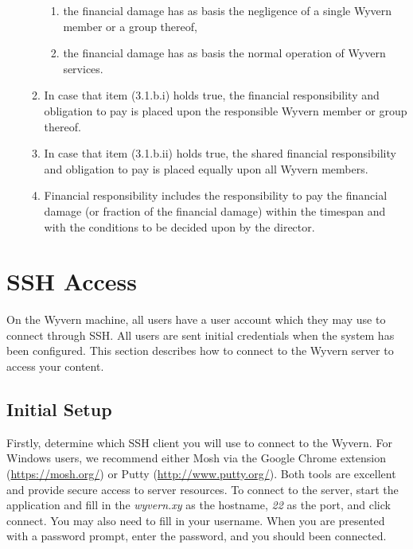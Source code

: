 \documentclass[a4paper]{article}
\begin{document}
\begin{appendices}
\begin{enumerate}
\begin{item}
\begin{enumerate}
\begin{item}
                \begin{enumerate}
                    \item the financial damage has as basis the negligence of a single Wyvern member or a group thereof,
                    \item the financial damage has as basis the normal operation of Wyvern services.
                \end{enumerate}
            \end{item}
        
            \item In case that item (3.1.b.i) holds true, the financial responsibility and obligation to pay is placed upon the responsible Wyvern member or group thereof.
            
            \item In case that item (3.1.b.ii) holds true, the shared financial responsibility and obligation to pay is placed equally upon all Wyvern members.
            
            \item Financial responsibility includes the responsibility to pay the financial damage (or fraction of the financial damage) within the timespan and with the conditions to be decided upon by the director.
        \end{enumerate}

    \end{item}
\end{enumerate}


\newpage
\section{SSH Access}
\label{sec:ssh}

On the Wyvern machine, all users have a user account which they may use to connect through SSH. All users are sent initial credentials when the system has been configured. This section describes how to connect to the Wyvern server to access your content.

\subsection{Initial Setup}
Firstly, determine which SSH client you will use to connect to the Wyvern. For Windows users, we recommend either Mosh via the Google Chrome extension (\url{https://mosh.org/}) or Putty (\url{http://www.putty.org/}). Both tools are excellent and provide secure access to server resources. To connect to the server, start the application and fill in the \textit{wyvern.xy} as the hostname, \textit{22} as the port, and click connect. You may also need to fill in your username. When you are presented with a password prompt, enter the password, and you should been connected.


\end{appendices}
\end{document}
